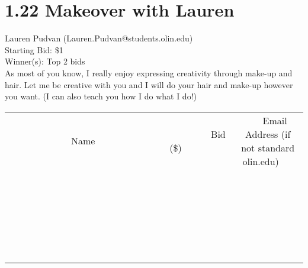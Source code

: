 \documentclass[11pt]{article}
\begin{document}
\section*{1.22 Makeover with Lauren}
Lauren Pudvan (Lauren.Pudvan@students.olin.edu) \\
Starting Bid: \$1 \\
Winner(s): 
Top 2 bids \\
As most of you know, I really enjoy expressing creativity through make-up and hair. Let me be creative with you and I will do your hair and make-up however you want. (I can also teach you how I do what I do!) \\[6ex]
\begin{tabular}{c c c}
~~~~~~~~~~~~~Name~~~~~~~~~~~~~ & ~~~~~~~~~Bid (\$)~~~~~~~~~ & ~~~Email Address (if not standard olin.edu)~~~ \\
 & & \\
\hline
 & & \\
\hline
 & & \\
\hline
 & & \\
\hline
 & & \\
\hline
 & & \\
\hline
 & & \\
\hline
 & & \\
\hline
 & & \\
\hline
 & & \\
\hline
 & & \\
\hline
 & & \\
\hline
 & & \\
\hline
 & & \\
\hline
 & & \\
\hline
 & & \\
\hline
 & & \\
\hline
 & & \\
\hline
 & & \\
\hline
 & & \\
\hline
 & & \\
\hline
 & & \\
\hline
 & & \\
\hline
 & & \\
\hline
 & & \\
\hline
 & & \\
\hline
\end{tabular}
\clearpage
\end{document}
